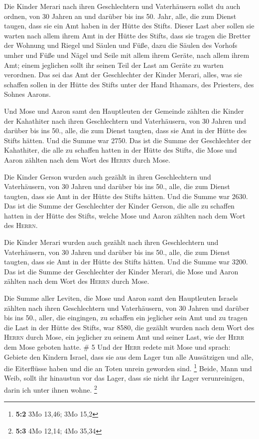  Die Kinder Merari nach ihren Geschlechtern und
Vaterhäusern sollst du auch ordnen,  von 30 Jahren an und
darüber bis ins 50. Jahr, alle, die zum Dienst taugen, dass sie ein Amt
haben in der Hütte des Stifts.  Dieser Last aber sollen
sie warten nach allem ihrem Amt in der Hütte des Stifts, dass sie tragen
die Bretter der Wohnung und Riegel und Säulen und Füße, 
dazu die Säulen des Vorhofs umher und Füße und Nägel und Seile mit allem
ihrem Geräte, nach allem ihrem Amt; einem jeglichen sollt ihr seinen
Teil der Last am Geräte zu warten verordnen.  Das sei das
Amt der Geschlechter der Kinder Merari, alles, was sie schaffen sollen
in der Hütte des Stifts unter der Hand Ithamars, des Priesters, des
Sohnes Aarons.

 Und Mose und Aaron samt den Hauptleuten der Gemeinde
zählten die Kinder der Kahathiter nach ihren Geschlechtern und
Vaterhäusern,  von 30 Jahren und darüber bis ins 50.,
alle, die zum Dienst taugten, dass sie Amt in der Hütte des Stifts
hätten.  Und die Summe war 2750.  Das ist
die Summe der Geschlechter der Kahathiter, die alle zu schaffen hatten
in der Hütte des Stifts, die Mose und Aaron zählten nach dem Wort des
\textsc{Herrn} durch Mose.

 Die Kinder Gerson wurden auch gezählt in ihren
Geschlechtern und Vaterhäusern,  von 30 Jahren und
darüber bis ins 50., alle, die zum Dienst taugten, dass sie Amt in der
Hütte des Stifts hätten.  Und die Summe war 2630.
 Das ist die Summe der Geschlechter der Kinder Gerson,
die alle zu schaffen hatten in der Hütte des Stifts, welche Mose und
Aaron zählten nach dem Wort des \textsc{Herrn}.

 Die Kinder Merari wurden auch gezählt nach ihren
Geschlechtern und Vaterhäusern,  von 30 Jahren und
darüber bis ins 50., alle, die zum Dienst taugten, dass sie Amt in der
Hütte des Stifts hätten.  Und die Summe war 3200.
 Das ist die Summe der Geschlechter der Kinder Merari,
die Mose und Aaron zählten nach dem Wort des \textsc{Herrn} durch Mose.

 Die Summe aller Leviten, die Mose und Aaron samt den
Hauptleuten Israels zählten nach ihren Geschlechtern und Vaterhäusern,
 von 30 Jahren und darüber bis ins 50., aller, die
eingingen, zu schaffen ein jeglicher sein Amt und zu tragen die Last in
der Hütte des Stifts,  war 8580,  die
gezählt wurden nach dem Wort des \textsc{Herrn} durch Mose, ein
jeglicher zu seinem Amt und seiner Last, wie der \textsc{Herr} dem Mose
geboten hatte. \# 5  Und der \textsc{Herr} redete mit Mose
und sprach:  Gebiete den Kindern Israel, dass sie aus dem
Lager tun alle Aussätzigen und alle, die Eiterflüsse haben und die an
Toten unrein geworden sind. \footnote{\textbf{5:2} 3Mo 13,46; 3Mo 15,2}
 Beide, Mann und Weib, sollt ihr hinaustun vor das Lager,
dass sie nicht ihr Lager verunreinigen, darin ich unter ihnen wohne.
\footnote{\textbf{5:3} 4Mo 12,14; 4Mo 35,34}

